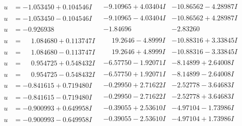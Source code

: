 \documentclass[1p]{elsarticle_modified}
\theoremstyle{definition}
\begin{document}
$$\begin{array}{c|c|c}
\begin{aligned}
u &= -1.053450 + 0.104546 I\end{aligned}
 & -9.10965 + 4.03404 I & -10.86562 - 4.28987 I \\ \hline\begin{aligned}
u &= -1.053450 - 0.104546 I\end{aligned}
 & -9.10965 - 4.03404 I & -10.86562 + 4.28987 I \\ \hline\begin{aligned}
u &= -0.926938\phantom{ +0.000000I}\end{aligned}
 & -1.84696\phantom{ +0.000000I} & -2.83260\phantom{ +0.000000I} \\ \hline\begin{aligned}
u &= \phantom{-}1.084680 + 0.113747 I\end{aligned}
 & \phantom{-}19.2646 - 4.8999 I & -10.88316 + 3.33845 I \\ \hline\begin{aligned}
u &= \phantom{-}1.084680 - 0.113747 I\end{aligned}
 & \phantom{-}19.2646 + 4.8999 I & -10.88316 - 3.33845 I \\ \hline\begin{aligned}
u &= \phantom{-}0.954725 + 0.548432 I\end{aligned}
 & -6.57750 - 1.92071 I & -8.14899 + 2.64008 I \\ \hline\begin{aligned}
u &= \phantom{-}0.954725 - 0.548432 I\end{aligned}
 & -6.57750 + 1.92071 I & -8.14899 - 2.64008 I \\ \hline\begin{aligned}
u &= -0.841615 + 0.719480 I\end{aligned}
 & -0.29950 + 2.71622 I & -2.52778 - 3.64683 I \\ \hline\begin{aligned}
u &= -0.841615 - 0.719480 I\end{aligned}
 & -0.29950 - 2.71622 I & -2.52778 + 3.64683 I \\ \hline\begin{aligned}
u &= -0.900993 + 0.649958 I\end{aligned}
 & -0.39055 + 2.53610 I & -4.97104 - 1.73986 I \\ \hline\begin{aligned}
u &= -0.900993 - 0.649958 I\end{aligned}
 & -0.39055 - 2.53610 I & -4.97104 + 1.73986 I \\ \hline\begin{aligned}

\end{aligned}
\end{array}$$
\end{document}
